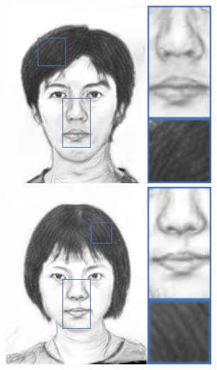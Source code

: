 \documentclass[10pt,twocolumn,letterpaper]{article}
\begin{document}
\begin{figure}[htbp]
{\begin{minipage}[b]{0.13\linewidth}
\includegraphics[width=0.99\linewidth]{img/sketch_result/ours_s1.png}
\includegraphics[width=0.99\linewidth]{img/sketch_result/ours_s2.png}

\end{minipage}}
\end{figure}
\end{document}
